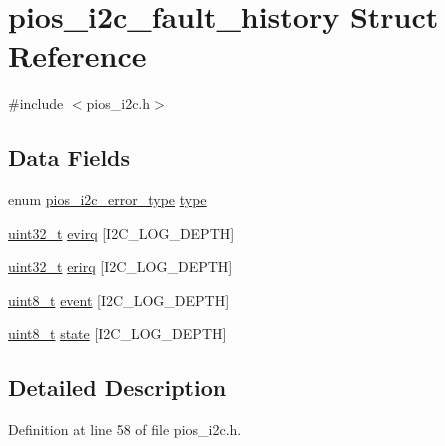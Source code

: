 \hypertarget{structpios__i2c__fault__history}{\section{pios\-\_\-i2c\-\_\-fault\-\_\-history Struct Reference}
\label{structpios__i2c__fault__history}
}


{\ttfamily \#include $<$pios\-\_\-i2c.\-h$>$}

\subsection*{Data Fields}
\begin{DoxyCompactItemize}
\item 
enum \hyperlink{group___p_i_o_s___i2_c_gace4c564ee87e97a12bf76c69b113b230}{pios\-\_\-i2c\-\_\-error\-\_\-type} \hyperlink{structpios__i2c__fault__history_af6d40156bcea64ae98966b65f779dccb}{type}
\item 
\hyperlink{stdint_8h_a435d1572bf3f880d55459d9805097f62}{uint32\-\_\-t} \hyperlink{structpios__i2c__fault__history_a77d686b8830f4fa32f9a2930df82be4d}{evirq} \mbox{[}I2\-C\-\_\-\-L\-O\-G\-\_\-\-D\-E\-P\-T\-H\mbox{]}
\item 
\hyperlink{stdint_8h_a435d1572bf3f880d55459d9805097f62}{uint32\-\_\-t} \hyperlink{structpios__i2c__fault__history_a7ffc99c5d0823e35355480c857e7dc6a}{erirq} \mbox{[}I2\-C\-\_\-\-L\-O\-G\-\_\-\-D\-E\-P\-T\-H\mbox{]}
\item 
\hyperlink{stdint_8h_aba7bc1797add20fe3efdf37ced1182c5}{uint8\-\_\-t} \hyperlink{structpios__i2c__fault__history_a1c5b34cc902d5ba1916914dc3cf7d5ba}{event} \mbox{[}I2\-C\-\_\-\-L\-O\-G\-\_\-\-D\-E\-P\-T\-H\mbox{]}
\item 
\hyperlink{stdint_8h_aba7bc1797add20fe3efdf37ced1182c5}{uint8\-\_\-t} \hyperlink{structpios__i2c__fault__history_aac4337b23aad02daaa33f5be193ea859}{state} \mbox{[}I2\-C\-\_\-\-L\-O\-G\-\_\-\-D\-E\-P\-T\-H\mbox{]}
\end{DoxyCompactItemize}


\subsection{Detailed Description}


Definition at line 58 of file pios\-\_\-i2c.\-h.



